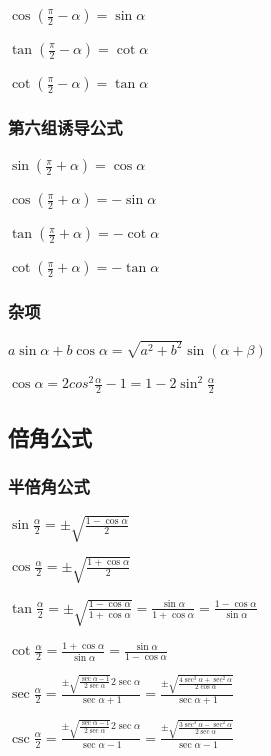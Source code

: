 \documentclass[UTF8]{ctexbook}
\begin{document}
{{{{    $\cos(\frac{\pi}{2} - \alpha) = \sin\alpha$

    $\tan(\frac{\pi}{2} - \alpha) = \cot\alpha$

    $\cot(\frac{\pi}{2} - \alpha) = \tan\alpha$
  }

  \subsubsection{第六组诱导公式}{
    $\sin(\frac{\pi}{2} + \alpha) = \cos\alpha$

    $\cos(\frac{\pi}{2} + \alpha) = -\sin\alpha$

    $\tan(\frac{\pi}{2} + \alpha) = -\cot\alpha$

    $\cot(\frac{\pi}{2} + \alpha) = -\tan\alpha$
  }

  \subsubsection{杂项}{
    $a\sin\alpha + b\cos\alpha = \sqrt{a^2 + b^2}\sin(\alpha+\beta)$

    $\cos\alpha = 2cos^2\frac{\alpha}{2} - 1 = 1-2\sin^2\frac{\alpha}{2}$
  }

}

\subsection{倍角公式}{
\subsubsection{半倍角公式}{
  $\sin\frac{\alpha}{2} = \pm\sqrt{\frac{1 - \cos\alpha}{2}}$

  $\cos\frac{\alpha}{2} = \pm\sqrt{\frac{1 + \cos\alpha}{2}}$

  $\tan\frac{\alpha}{2} = \pm\sqrt{\frac{1-\cos\alpha}{1+\cos\alpha}} = \frac{\sin\alpha}{1+\cos\alpha} = \frac{1-\cos\alpha}{\sin\alpha}$

  $\cot\frac{\alpha}{2} = \frac{1+\cos\alpha}{\sin\alpha} = \frac{\sin\alpha}{1-\cos\alpha}$

  $\sec\frac{\alpha}{2} = \frac{\pm\sqrt{\frac{\sec\alpha - 1}{2\sec\alpha}}2\sec\alpha}{\sec\alpha + 1} = \frac{\pm\sqrt{\frac{4\sec^3\alpha + \sec^2\alpha}{2\cos\alpha}}}{\sec\alpha + 1}$

  $\csc\frac{\alpha}{2} = \frac{\pm\sqrt{\frac{\sec\alpha - 1}{2\sec\alpha}}2\sec\alpha}{\sec\alpha - 1} = \frac{\pm\sqrt{\frac{3\sec^3\alpha - \sec^2\alpha}{2\sec\alpha}}}{\sec\alpha - 1}$
}

}}}
\end{document}
